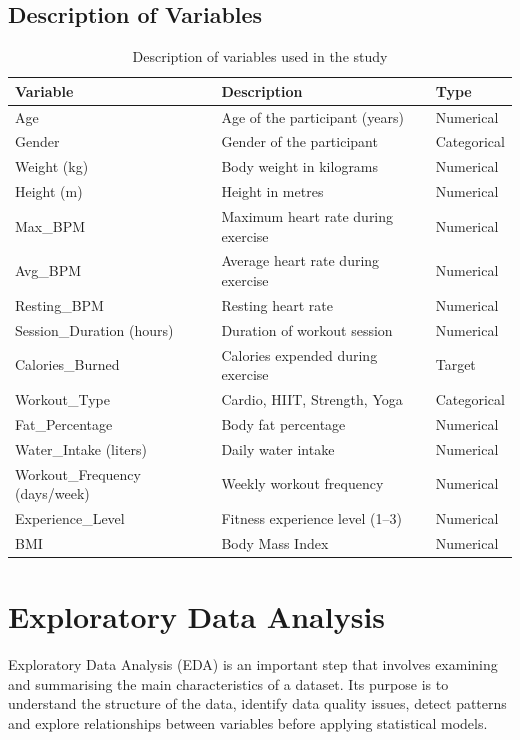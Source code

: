 \documentclass[12pt,a4paper]{report}
\begin{document}
\section{Description of Variables}
\begin{table}[H]
\centering\small
\begin{tabular}{lll}
\toprule
\textbf{Variable} & \textbf{Description} & \textbf{Type}\\
\midrule
Age & Age of the participant (years) & Numerical\\
Gender & Gender of the participant & Categorical\\
Weight (kg) & Body weight in kilograms & Numerical\\
Height (m) & Height in metres & Numerical\\
Max\_BPM & Maximum heart rate during exercise & Numerical\\
Avg\_BPM & Average heart rate during exercise & Numerical\\
Resting\_BPM & Resting heart rate & Numerical\\
Session\_Duration (hours) & Duration of workout session & Numerical\\
Calories\_Burned & Calories expended during exercise & Target\\
Workout\_Type & Cardio, HIIT, Strength, Yoga & Categorical\\
Fat\_Percentage & Body fat percentage & Numerical\\
Water\_Intake (liters) & Daily water intake & Numerical\\
Workout\_Frequency (days/week) & Weekly workout frequency & Numerical\\
Experience\_Level & Fitness experience level (1--3) & Numerical\\
BMI & Body Mass Index & Numerical\\
\bottomrule
\end{tabular}
\caption{Description of variables used in the study}
\end{table}

\chapter{Exploratory Data Analysis}
Exploratory Data Analysis (EDA) is an important step that involves examining and summarising the main characteristics of a dataset. Its purpose is to understand the structure of the data, identify data quality issues, detect patterns and explore relationships between variables before applying statistical models.
\end{document}
